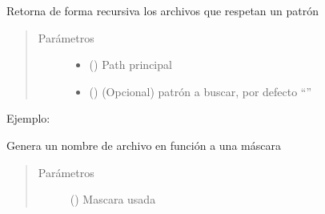 \documentclass[a4paper,12pt,spanish]{sphinxmanual}
\begin{document}
\begin{fulllineitems}
\label{\detokenize{openerm.Utils:openerm.Utils.filesInPath}}
Retorna de forma recursiva los archivos que respetan un patrón
\begin{quote}\begin{description}
\item[{Parámetros}] \leavevmode\begin{itemize}
\item {} 
 () \textendash{} Path principal

\item {} 
 () \textendash{} (Opcional) patrón a buscar, por defecto “”

\end{itemize}

\end{description}\end{quote}
\begin{description}
\item[{Ejemplo:}] \leavevmode
\begin{sphinxVerbatim}[commandchars=\\\{\}]
    
    
\end{sphinxVerbatim}

\end{description}

\end{fulllineitems}


\begin{fulllineitems}
\label{\detokenize{openerm.Utils:openerm.Utils.generate_filename}}
Genera un nombre de archivo en función a una máscara
\begin{quote}\begin{description}
\item[{Parámetros}] \leavevmode
{} () \textendash{} Mascara usada

\end{description}\end{quote}

\end{fulllineitems}
\end{document}
